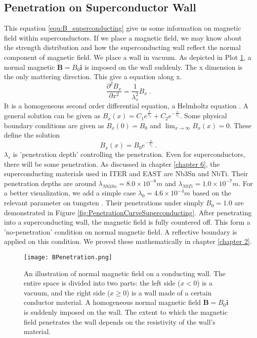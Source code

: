 \subsection{Penetration on Superconductor Wall}
This equation \ref{equ:B_superconducting} give us some information on magnetic field within superconductors. If we place a magnetic field, we may know about the strength distribution and how the superconducting wall reflect the normal component of magnetic field. We place a wall in vacuum. As depicted in Plot \ref{fig:magneticPenetration}, a normal magnetic $\mathbf{B}=B_0\mathbf{i}$ is imposed on the wall suddenly. The x dimension is the only mattering direction. This give a equation along x.
\begin{equation}
	\frac{\partial^2 B_x}{\partial x^2}=\frac{1}{\lambda_s^2}B_x\ .
\end{equation}
It is a homogeneous second order differential equation, a Helmholtz equation \cite{london_equations_wikipedia}. A general solution can be given as $B_x(x)=C_1e^{\frac{x}{\lambda_s}}+C_2e^{-\frac{x}{\lambda_s}}$. Some physical boundary conditions are given as $B_x(0)=B_0$ and $\lim_{x \to \infty} B_x(x)=0$. These define the solution
\begin{equation}
	B_x(x)=B_0e^{-\frac{x}{\lambda_s}}\ .
\end{equation}
$\lambda_s$ is 'penetration depth' controlling the penetration. Even for superconductors, there will be some penetration. As discussed in chapter \ref{chapter 6}, the superconducting materials used in ITER and EAST are Nb3Sn and NbTi. Their penetration depths are around $\lambda_{Nb3Sn}=8.0\times10^{-8}m$ and $\lambda_{NbTi}=1.0\times10^{-7}m$. For a better visualization, we add a simple case    $\lambda_{0}=4.6\times10^{-4}m$ based on the relevant parameter on tungsten \cite{greiner2012classical}. Their penetrations under simply $B_0=1.0$ are demonstrated in Figure \ref{fig:PenetrationCurveSuperconducting}. After penetrating into a superconducting wall, the magnetic field is fully countered off. This form a 'no-penetration' condition on normal magnetic field. A reflective boundary is applied on this condition. We proved these mathematically in chapter \ref{chapter 2}. 
 
\begin{figure}[H]
	\centering
	\texttt{[image: BPenetration.png]}
	\caption[Magnetic Penetration]{An illustration of normal magnetic field on a conducting wall. The entire space is divided into two parts: the left side ($x<0$) is a vacuum, and the right side ($x\geq0$) is a wall made of a certain conductor material. A homogeneous normal magnetic field $\mathbf{B}=B_0\mathbf{i}$ is suddenly imposed on the wall. The extent to which the magnetic field penetrates the wall depends on the resistivity of the wall's material.}
	\label{fig:magneticPenetration}
\end{figure}

